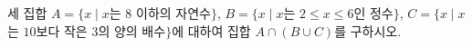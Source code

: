 세 집합 $A=\{x \mid x$는 $8$ 이하의 자연수$\}$, $B=\{x \mid x$는 $2\le x\le 6$인 정수$\}$, $C=\{x \mid x$는 $10$보다 작은 $3$의 양의 배수$\}$에 대하여 집합 $A\cap(B\cup C)$를 구하시오.
